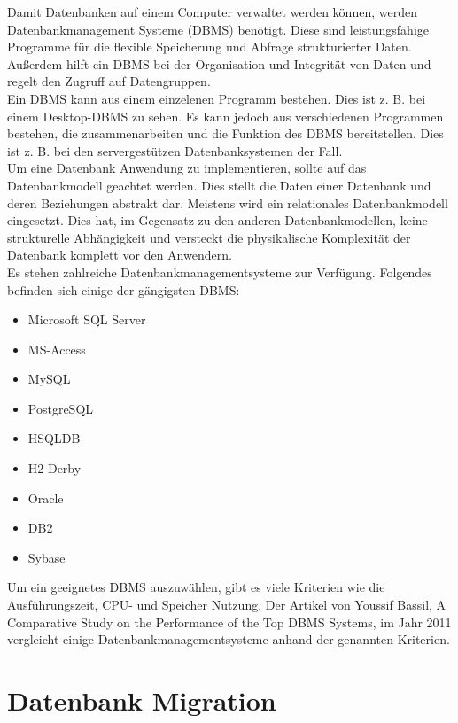 Damit Datenbanken auf einem Computer verwaltet werden können, werden Datenbankmanagement Systeme (DBMS) benötigt. Diese sind leistungsfähige Programme für die flexible Speicherung und Abfrage strukturierter Daten. \\
Außerdem hilft ein DBMS bei der Organisation und Integrität von Daten und regelt den Zugruff auf Datengruppen. \\
Ein DBMS kann aus einem einzelenen Programm bestehen. Dies ist z. B. bei einem Desktop-DBMS zu sehen. Es kann jedoch aus verschiedenen Programmen bestehen, die zusammenarbeiten und die Funktion des DBMS bereitstellen. Dies ist z. B. bei den servergestützen Datenbanksystemen der Fall.\\
Um eine Datenbank Anwendung zu implementieren, sollte auf das Datenbankmodell geachtet werden. Dies stellt die Daten einer Datenbank und deren Beziehungen abstrakt dar. Meistens wird ein relationales Datenbankmodell eingesetzt. Dies hat, im Gegensatz zu den anderen Datenbankmodellen, keine strukturelle Abhängigkeit und versteckt die physikalische Komplexität der Datenbank komplett vor den Anwendern.\\
Es stehen zahlreiche Datenbankmanagementsysteme zur Verfügung. Folgendes befinden sich einige der gängigsten DBMS:
\begin{itemize}
	\item Microsoft SQL Server
	\item MS-Access
	\item MySQL
	\item PostgreSQL
	\item HSQLDB
	\item H2 Derby
	\item Oracle
	\item DB2
	\item Sybase
\end{itemize}
Um ein geeignetes DBMS auszuwählen, gibt es viele Kriterien wie die Ausführungszeit, CPU- und Speicher Nutzung. Der Artikel von Youssif Bassil, A Comparative Study on the Performance of the Top DBMS Systems, im Jahr 2011 vergleicht einige Datenbankmanagementsysteme anhand der genannten Kriterien.
\section{Datenbank Migration}

